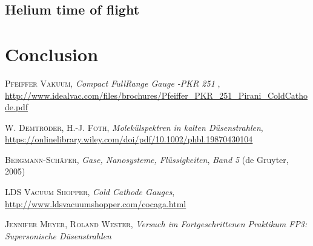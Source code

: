 \documentclass[a4paper,10pt]{article}
\begin{document}
\subsection{Helium time of flight}

\section{Conclusion}

\begin{thebibliography}{99}
\textsc{Pfeiffer Vakuum}, \textit{Compact FullRange Gauge -PKR 251 }, \url{http://www.idealvac.com/files/brochures/Pfeiffer_PKR_251_Pirani_ColdCathode.pdf}

\textsc{W. Demtröder, H.-J. Foth}, \textit{Molekülspektren in kalten Düsenstrahlen}, \url{https://onlinelibrary.wiley.com/doi/pdf/10.1002/phbl.19870430104}

\textsc{Bergmann-Schäfer}, \textit{Gase, Nanosysteme, Flüssigkeiten}, \textit{Band 5} (de Gruyter, 2005)

\textsc{LDS Vacuum Shopper}, \textit{Cold Cathode Gauges}, \url{http://www.ldsvacuumshopper.com/cocaga.html}

\textsc{Jennifer Meyer, Roland Wester}, \textit{Versuch im Fortgeschrittenen Praktikum FP3: Supersonische Düsenstrahlen}
\end{thebibliography}
\end{document}
